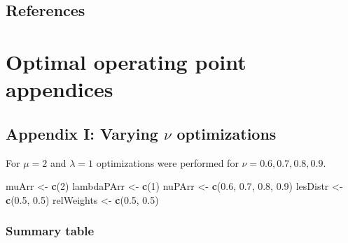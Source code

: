 \documentclass[
]{book}
\newenvironment{Shaded}{\begin{snugshade}}{\end{snugshade}}
\newcommand{\DecValTok}[1]{\textcolor[rgb]{0.00,0.00,0.81}{#1}}
\newcommand{\FloatTok}[1]{\textcolor[rgb]{0.00,0.00,0.81}{#1}}
\newcommand{\KeywordTok}[1]{\textcolor[rgb]{0.13,0.29,0.53}{\textbf{#1}}}
\newcommand{\NormalTok}[1]{#1}
\newcommand{\StringTok}[1]{\textcolor[rgb]{0.31,0.60,0.02}{#1}}
\begin{document}
\hypertarget{optim-op-point-references}{%
\section{References}\label{optim-op-point-references}}

\hypertarget{optim-op-point-appendices}{%
\chapter{Optimal operating point appendices}\label{optim-op-point-appendices}}

\hypertarget{optim-op-point-vary-nu}{%
\section{\texorpdfstring{Appendix I: Varying \(\nu\) optimizations}{Appendix I: Varying \textbackslash nu optimizations}}\label{optim-op-point-vary-nu}}

For \(\mu = 2\) and \(\lambda = 1\) optimizations were performed for \(\nu = 0.6, 0.7, 0.8, 0.9\).

\begin{Shaded}
\begin{Highlighting}[]
\NormalTok{muArr <-}\StringTok{ }\KeywordTok{c}\NormalTok{(}\DecValTok{2}\NormalTok{)}
\NormalTok{lambdaPArr <-}\StringTok{ }\KeywordTok{c}\NormalTok{(}\DecValTok{1}\NormalTok{)}
\NormalTok{nuPArr <-}\StringTok{ }\KeywordTok{c}\NormalTok{(}\FloatTok{0.6}\NormalTok{, }\FloatTok{0.7}\NormalTok{, }\FloatTok{0.8}\NormalTok{, }\FloatTok{0.9}\NormalTok{)}
\NormalTok{lesDistr <-}\StringTok{ }\KeywordTok{c}\NormalTok{(}\FloatTok{0.5}\NormalTok{, }\FloatTok{0.5}\NormalTok{)}
\NormalTok{relWeights <-}\StringTok{ }\KeywordTok{c}\NormalTok{(}\FloatTok{0.5}\NormalTok{, }\FloatTok{0.5}\NormalTok{)}
\end{Highlighting}
\end{Shaded}

\hypertarget{summary-table-2}{%
\subsection{Summary table}\label{summary-table-2}}
\end{document}

